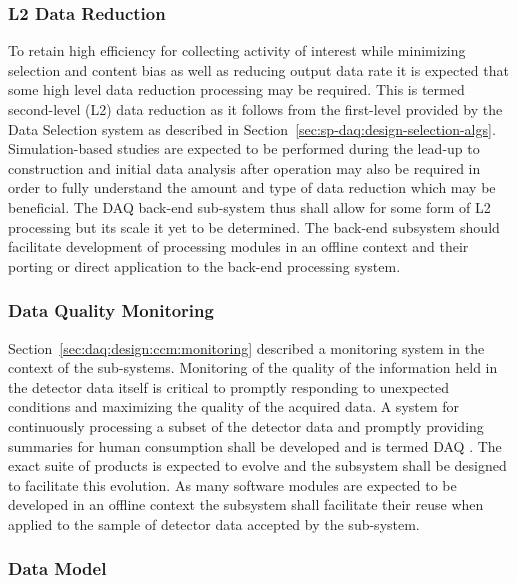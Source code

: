 \subsubsection{L2 Data Reduction}
\label{sec:fd-daq:design-data-reduction}

To retain high efficiency for collecting activity of interest while minimizing selection and content bias as well as reducing output data rate it is expected that some high level data reduction processing may be required. 
This is termed second-level (L2) data reduction as it follows from the first-level provided by the Data Selection system as described in Section~\ref{sec:sp-daq:design-selection-algs}.
Simulation-based studies are expected to be performed during the lead-up to construction and initial data analysis after operation may also be required in order to fully understand the amount and type of data reduction which may be beneficial. 
The DAQ back-end sub-system thus shall allow for some form of L2 processing but its scale it yet to be determined. 
The back-end subsystem should facilitate development of processing modules in an offline context and their porting or direct application to the back-end processing system.



\subsubsection{Data Quality Monitoring}
\label{sec:fd-daq:design-data-quality}

Section~\ref{sec:daq:design:ccm:monitoring} described a monitoring system in the context of the  sub-systems. 
Monitoring of the quality of the information held in the detector data itself is critical to promptly responding to unexpected conditions and maximizing the quality of the acquired data. 
A system for continuously processing a subset of the detector data and promptly providing summaries for human consumption shall be developed and is termed DAQ .
The exact suite of products is expected to evolve and the  subsystem shall be designed to facilitate this evolution. 
As many software modules are expected to be developed in an offline context the  subsystem shall facilitate their reuse when applied to the sample of detector data accepted by the sub-system.


\subsubsection{Data Model}
\label{sec:fd-daq:design-data-model}

